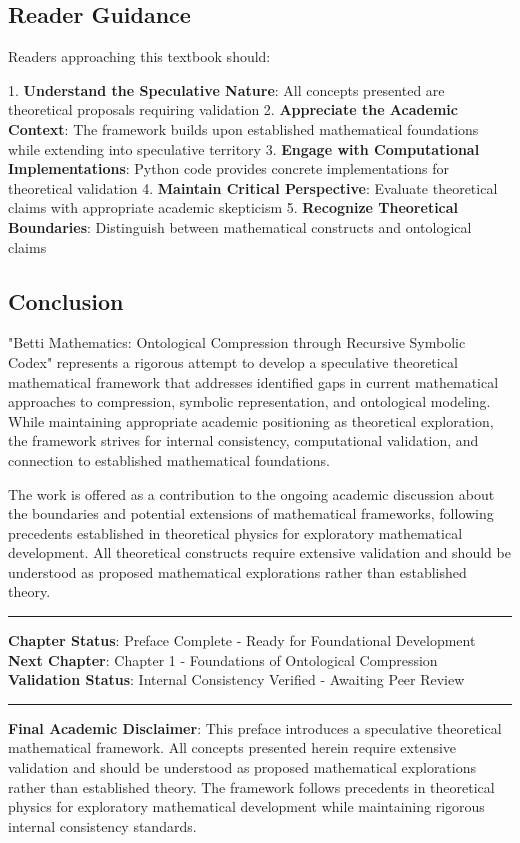 \subsection{Reader Guidance}

Readers approaching this textbook should:

1. \textbf{Understand the Speculative Nature}: All concepts presented are theoretical proposals requiring validation
2. \textbf{Appreciate the Academic Context}: The framework builds upon established mathematical foundations while extending into speculative territory
3. \textbf{Engage with Computational Implementations}: Python code provides concrete implementations for theoretical validation
4. \textbf{Maintain Critical Perspective}: Evaluate theoretical claims with appropriate academic skepticism
5. \textbf{Recognize Theoretical Boundaries}: Distinguish between mathematical constructs and ontological claims

\subsection{Conclusion}

"Betti Mathematics: Ontological Compression through Recursive Symbolic Codex" represents a rigorous attempt to develop a speculative theoretical mathematical framework that addresses identified gaps in current mathematical approaches to compression, symbolic representation, and ontological modeling. While maintaining appropriate academic positioning as theoretical exploration, the framework strives for internal consistency, computational validation, and connection to established mathematical foundations.

The work is offered as a contribution to the ongoing academic discussion about the boundaries and potential extensions of mathematical frameworks, following precedents established in theoretical physics for exploratory mathematical development. All theoretical constructs require extensive validation and should be understood as proposed mathematical explorations rather than established theory.

\hrule

\textbf{Chapter Status}: Preface Complete - Ready for Foundational Development  
\textbf{Next Chapter}: Chapter 1 - Foundations of Ontological Compression  
\textbf{Validation Status}: Internal Consistency Verified - Awaiting Peer Review

\hrule

\textbf{Final Academic Disclaimer}: This preface introduces a speculative theoretical mathematical framework. All concepts presented herein require extensive validation and should be understood as proposed mathematical explorations rather than established theory. The framework follows precedents in theoretical physics for exploratory mathematical development while maintaining rigorous internal consistency standards.